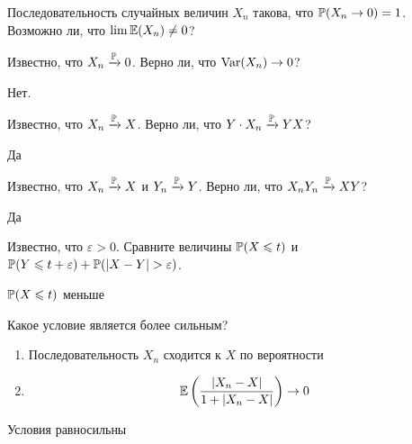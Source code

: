 \begin{problem}
Последовательность случайных величин $X_n$ такова, что $\P(X_n\to 0)=1$. Возможно ли, что $\lim \E(X_n)\neq 0$?

\begin{sol}

\end{sol}
\end{problem}

\begin{problem}
Известно, что $X_n \xrightarrow{\P} 0$. Верно ли, что $\Var(X_n)\to 0$?

\begin{sol}
Нет.
\end{sol}
\end{problem}

\begin{problem}
Известно, что $X_n \xrightarrow{\P} X$. Верно ли, что $Y\cdot X_n \xrightarrow{\P} YX$?

\begin{sol}
Да
\end{sol}
\end{problem}

\begin{problem}
Известно, что $X_n \xrightarrow{\P} X$ и $Y_n \xrightarrow{\P} Y$. Верно ли, что $X_nY_n \xrightarrow{\P} XY$?

\begin{sol}
Да
\end{sol}
\end{problem}

\begin{problem}
Известно, что $\varepsilon>0$. Сравните величины $\P(X\leq t)$ и $\P(Y\leq t+\varepsilon)+\P(|X-Y|>\varepsilon)$.

\begin{sol}
$\P(X\leq t)$ меньше
\end{sol}
\end{problem}

\begin{problem}
Какое условие является более сильным?
\begin{enumerate}
\item Последовательность $X_n$ сходится к $X$ по вероятности
\item \[
\E\left(\frac{|X_n-X|}{1+|X_n-X|}\right)\to 0
\]
\end{enumerate}

\begin{sol}
Условия равносильны
\end{sol}
\end{problem}


